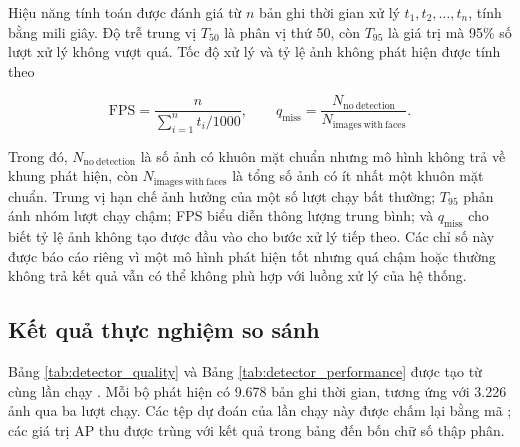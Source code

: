 \documentclass[../LuanVan.tex]{subfiles}
\begin{document}
Hiệu năng tính toán được đánh giá từ $n$ bản ghi thời gian xử lý $t_1,t_2,\ldots,t_n$, tính bằng mili giây. Độ trễ trung vị $T_{50}$ là phân vị thứ 50, còn $T_{95}$ là giá trị mà 95\% số lượt xử lý không vượt quá. Tốc độ xử lý và tỷ lệ ảnh không phát hiện được tính theo

\begin{equation}
    \mathrm{FPS}=\frac{n}{\displaystyle\sum_{i=1}^{n}t_i/1000},\qquad
    q_{\mathrm{miss}}=\frac{N_{\mathrm{no\ detection}}}{N_{\mathrm{images\ with\ faces}}}.
    \label{eq:performance_metrics}
\end{equation}

Trong đó, $N_{\mathrm{no\ detection}}$ là số ảnh có khuôn mặt chuẩn nhưng mô hình không trả về khung phát hiện, còn $N_{\mathrm{images\ with\ faces}}$ là tổng số ảnh có ít nhất một khuôn mặt chuẩn. Trung vị hạn chế ảnh hưởng của một số lượt chạy bất thường; $T_{95}$ phản ánh nhóm lượt chạy chậm; FPS biểu diễn thông lượng trung bình; và $q_{\mathrm{miss}}$ cho biết tỷ lệ ảnh không tạo được đầu vào cho bước xử lý tiếp theo. Các chỉ số này được báo cáo riêng vì một mô hình phát hiện tốt nhưng quá chậm hoặc thường không trả kết quả vẫn có thể không phù hợp với luồng xử lý của hệ thống.

\subsection{Kết quả thực nghiệm so sánh}
\label{subsection:5.1.2}

Bảng \ref{tab:detector_quality} và Bảng \ref{tab:detector_performance} được tạo từ cùng lần chạy . Mỗi bộ phát hiện có 9.678 bản ghi thời gian, tương ứng với 3.226 ảnh qua ba lượt chạy. Các tệp dự đoán của lần chạy này được chấm lại bằng mã ; các giá trị AP thu được trùng với kết quả trong bảng đến bốn chữ số thập phân.

\begin{table}[H]
    \centering
    \caption{Kết quả chất lượng phát hiện trên tập xác thực WIDER FACE}
    \label{tab:detector_quality}
\end{table}
\end{document}
